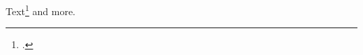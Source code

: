 \documentclass{article}
\begin{document}
Text\footcite{just22} and more.
\printbibliography
\end{document}
